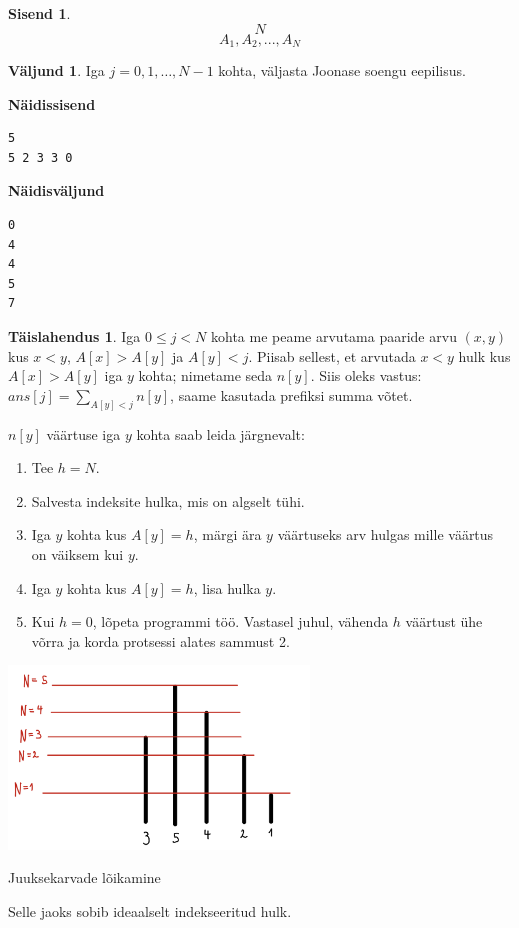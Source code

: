\documentclass{trkut}
\theoremstyle{definition}
\newtheorem*{solution}{Täislahendus}
\newtheorem*{Input}{Sisend}
\newtheorem*{Output}{Väljund}
\begin{document}
\begin{Input}
\[N\]
\[A_1, A_2, ..., A_N\]

\end{Input}

\begin{Output}
Iga  $j=0,1,…,N−1$ kohta, väljasta Joonase soengu eepilisus.
\end{Output}



\textbf{Näidissisend}

\begin{verbatim}
5
5 2 3 3 0
\end{verbatim}

\textbf{Näidisväljund}

\begin{verbatim}
0
4
4
5
7
\end{verbatim}


\begin{solution}
Iga $0≤j<N$ kohta me peame arvutama paaride arvu $(x,y)$ kus $x<y$,  $A[x]>A[y]$ ja $A[y]<j$. 
Piisab sellest, et arvutada $x<y$ hulk kus $A[x]>A[y]$ iga $y$ kohta; nimetame seda $n[y]$. 
Siis oleks vastus: $ans[j]=∑_{A[y]<j}n[y]$, saame kasutada prefiksi summa võtet.

$n[y]$ väärtuse iga $y$ kohta saab leida järgnevalt:
\begin{enumerate}
    \item  Tee $h=N$.
    \item   Salvesta indeksite hulka, mis on algselt tühi.
    \item  Iga $y$ kohta kus $A[y]=h$, märgi ära $y$ väärtuseks arv hulgas mille väärtus on väiksem kui $y$.
    \item  Iga $y$ kohta kus  $A[y]=h$, lisa hulka $y$.
    \item  Kui $h=0$, lõpeta programmi töö. Vastasel juhul, vähenda $h$ väärtust ühe võrra ja korda protsessi alates sammust 2.
\end{enumerate}

\begin{kk}[H]%
    \includegraphics[width=8cm]{jooned.png}%
    \caption{Juuksekarvade lõikamine}%
    \label{EMaxx}%
\end{kk}

Selle jaoks sobib ideaalselt indekseeritud hulk.
\end{solution}
\end{document}
